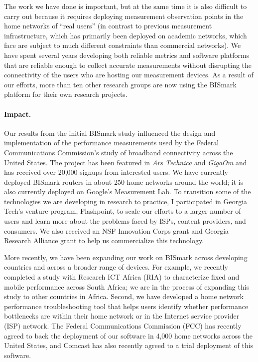 \documentclass{article}
\begin{document}
The work we have done is important, but at the same time it is also
difficult to carry out because it requires deploying measurement
observation points in the home networks of ``real users'' (in contrast
to previous measurement infrastructure, which has primarily been
deployed on academic networks, which face are subject to much different
constraints than commercial networks).  We have spent several years
developing both reliable metrics and software platforms that are
reliable enough to collect accurate measurements without disrupting the
connectivity of the users who are hosting our measurement devices.   As
a result of our efforts, more than ten other research groups are now
using the BISmark platform for their own research projects.

\paragraph{Impact.} 
Our results from the initial BISmark study influenced the design and
implementation of the performance measurements used by the Federal
Communications Commission's study of broadband connectivity across the
United States.  The project has been featured in {\em Ars Technica} and
{\em GigaOm} and has received over 20,000 signups from interested users.
We have currently deployed BISmark routers in about 250 home networks
around the world; it is also currently deployed on Google's Measurement
Lab.  To transition some of the technologies we are developing in
research to practice, I participated in Georgia Tech's venture program,
Flashpoint, to scale our efforts to a larger number of users and learn
more about the problems faced by ISPs, content providers, and consumers.
We also received an NSF Innovation Corps grant and Georgia Research
Alliance grant to help us commercialize this technology.

More recently, we have been expanding our work on BISmark across
developing countries and across a broader range of devices.  For
example, we recently completed a study with Research ICT Africa (RIA) to
characterize fixed and mobile performance across South Africa; we are in
the process of expanding this study to other countries in Africa.
Second, we have developed a home network performance troubleshooting
tool that helps users identify whether performance bottlenecks are
within their home network or in the Internet service provider (ISP)
network.  The Federal Communications Commission (FCC) has recently
agreed to back the deployment of our software in 4,000 home networks
across the United States, and Comcast has also recently agreed to a
trial deployment of this software. 
\end{document}
